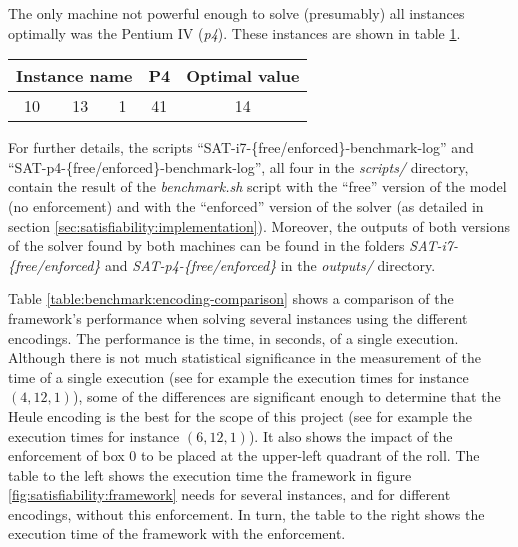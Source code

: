 The only machine not powerful enough to solve (presumably) all instances optimally
was the Pentium IV (\textit{p4}). These instances are shown in table
\ref{table:benchmark:SAT-results:suboptimalinstances}.

\begin{table}[H]
\centering
	\begin{tabular}{ccccc}
		\multicolumn{3}{c}{Instance name}
					& P4		& Optimal value \\
		\midrule
		10 & 13 & 1	& 41		& 14 \\
	\end{tabular}
	\label{table:benchmark:SAT-results:suboptimalinstances}
\end{table}

For further details, the scripts ``SAT-i7-\{free/enforced\}-benchmark-log''
and ``SAT-p4-\{free/enforced\}-benchmark-log'', all four in the \textit{scripts/}
directory, contain the result of the \textit{benchmark.sh} script with the ``free''
version of the model (no enforcement) and with the ``enforced'' version of the solver
(as detailed in section \ref{sec:satisfiability:implementation}). Moreover, the
outputs of both versions of the solver found by both machines can be found in the
folders \textit{SAT-i7-\{free/enforced\}} and \textit{SAT-p4-\{free/enforced\}}
in the \textit{outputs/} directory.

\hfill

Table \ref{table:benchmark:encoding-comparison} shows a comparison of the framework's
performance when solving several instances using the different encodings. The performance
is the time, in seconds, of a single execution. Although there is not much statistical
significance in the measurement of the time of a single execution (see for example the
execution times for instance $(4,12,1)$), some of the differences
are significant enough to determine that the Heule encoding is the best for the scope
of this project (see for example the execution times for instance $(6,12,1)$).
It also shows the impact of the enforcement of box 0 to be
placed at the upper-left quadrant of the roll. The table to the left shows the execution time
the framework in figure \ref{fig:satisfiability:framework} needs for several instances,
and for different encodings, without this enforcement. In turn, the table to the right
shows the execution time of the framework with the enforcement.

